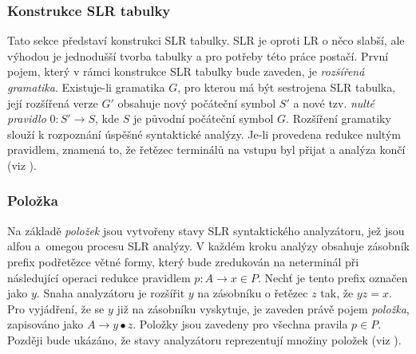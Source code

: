 \subsubsection{Konstrukce SLR tabulky}
Tato sekce představí konstrukci SLR tabulky. SLR je oproti LR o něco slabší, ale výhodou je jednodušší tvorba tabulky a pro potřeby této práce postačí.
První pojem, který v rámci konstrukce SLR tabulky bude zaveden, je \emph{rozšířená gramatika}. Existuje-li gramatika $G$, pro kterou má být sestrojena SLR tabulka,
její rozšířená verze $G'$ obsahuje nový počáteční symbol $S'$ a nové tzv. \emph{nulté pravidlo} $0\!: S' \rightarrow S$, kde $S$ je původní počáteční symbol $G$. Rozšíření gramatiky
slouží k rozpoznání úspěšné syntaktické analýzy. Je-li provedena redukce nultým pravidlem, znamená to, že řetězec terminálů na vstupu byl přijat a analýza
končí (viz \cite{Alfred:2007:Compilers}).

\subsubsection{Položka}
Na základě \emph{položek} jsou vytvořeny stavy SLR syntaktického analyzátoru, jež jsou alfou a~omegou procesu SLR analýzy.
V každém kroku analýzy obsahuje zásobník prefix podřetězce větné formy, který bude zredukován na neterminál při následující operaci redukce pravidlem $p\!: A \rightarrow x \in P$.
Nechť je tento prefix označen jako $y$. Snaha analyzátoru je rozšířit $y$ na zásobníku o řetězec $z$ tak, že $yz = x$. Pro vyjádření, že se $y$ již na zásobníku vyskytuje, je zaveden právě
pojem \emph{položka}, zapisováno jako $A \rightarrow y \bullet z$. Položky jsou zavedeny pro všechna pravila $p \in P$.
Později bude ukázáno, že stavy analyzátoru reprezentují množiny položek (viz \cite{Meduna:2014:FormalLanguagesAndComputation}).

